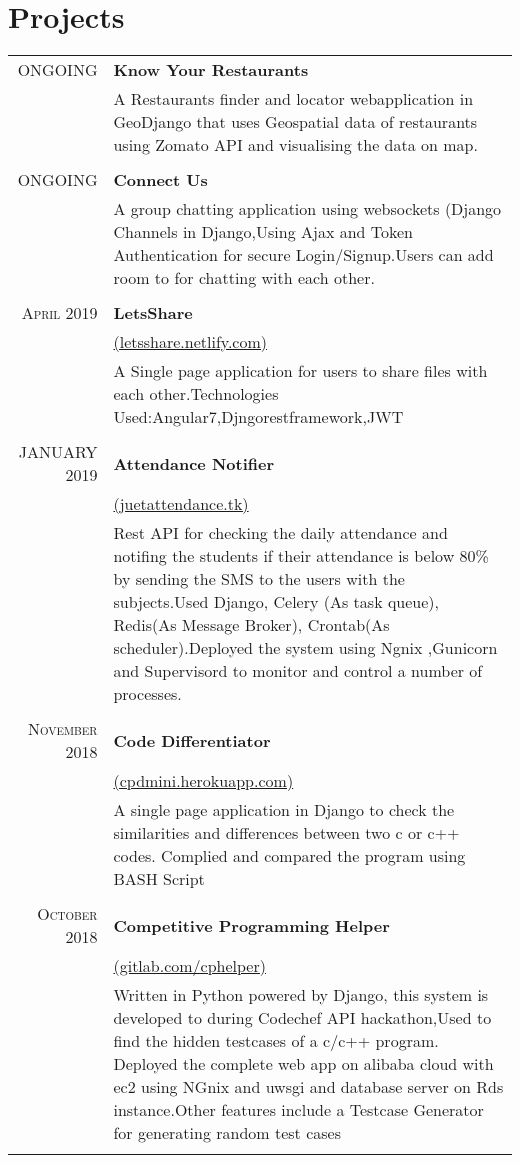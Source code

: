 \documentclass[a4paper,1pt]{article}
\begin{document}
\section{Projects}
\begin{tabular}{r|p{11cm}}
\textsc{ONGOING} & \textbf{Know Your Restaurants}\\&\footnotesize{A Restaurants finder and locator webapplication in GeoDjango that uses Geospatial data of restaurants using Zomato API and visualising the data on map.}\\\multicolumn{2}{c}{}\\
\textsc{ONGOING} & \textbf{Connect Us}\\&\footnotesize{A group chatting application using websockets (Django Channels in Django,Using Ajax and Token Authentication for secure Login/Signup.Users can add room to for chatting with each other.}\\\multicolumn{2}{c}{}\\
\textsc{April 2019} & \textbf{LetsShare}\\&\href{https://letsshare.netlify.com}{(letsshare.netlify.com)}\\&\footnotesize{A Single page application for users to share files with each other.Technologies Used:Angular7,Djngorestframework,JWT}\\\multicolumn{2}{c}{}\\
 \textsc{JANUARY 2019} & \textbf{Attendance Notifier}\\&\href{http://18.191.156.30:8000/api/v1/}{(juetattendance.tk)}\\&\footnotesize{Rest API for checking the daily attendance and notifing the students if their attendance
is below 80\% by sending the SMS to the users with the subjects.Used Django, Celery (As task queue), Redis(As Message Broker), Crontab(As scheduler).Deployed the system using Ngnix ,Gunicorn and Supervisord to monitor and control a number of processes.}\\\multicolumn{2}{c}{}\\
\textsc{November 2018} & \textbf{Code Differentiator}\\&\href{http://cpdmini.herokuapp.com/}{(cpdmini.herokuapp.com)}\\&\footnotesize{A single page application in Django to check the similarities and differences between two
c or c++ codes. Complied and compared the program using BASH Script}\\\multicolumn{2}{c}{} \\
\textsc{October 2018} & \textbf{Competitive Programming Helper}\\&\href{https://gitlab.com/gautamaggrawal/cphackathon}{(gitlab.com/cphelper)}\\&\footnotesize{Written in Python powered by Django, this system is developed to during Codechef API
hackathon,Used to find the hidden testcases of a c/c++ program. Deployed the complete web app on alibaba
cloud with ec2 using NGnix and uwsgi and database server on Rds instance.Other
features include a Testcase Generator for generating random test cases }\\\multicolumn{2}{c}{}\\
\end{tabular}\bigskip\par
\end{document}
